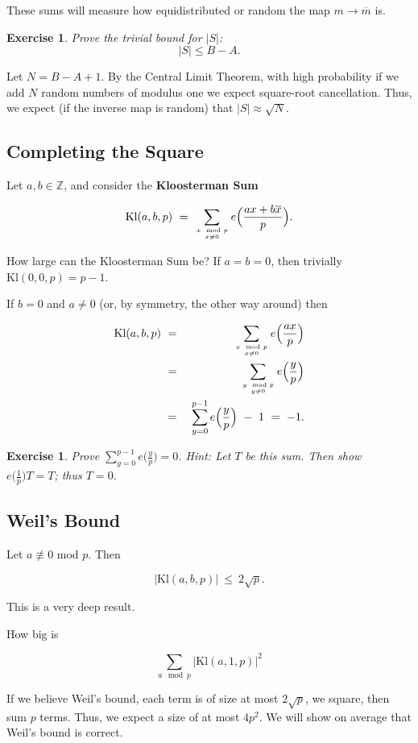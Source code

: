 \documentclass[12pt,letterpaper]{report}
\newcommand\be{\begin{equation}}
\newcommand\ee{\end{equation}}
\newcommand\bea{\begin{eqnarray}}
\newcommand\eea{\end{eqnarray}}
\newcommand{\Z}{\ensuremath{\mathbb{Z}}}
\newtheorem{exe}[thm]{Exercise}
\begin{document}
These sums will measure how equidistributed or random the map $m
\to \overline{m}$ is.

\begin{exe} Prove the trivial bound for $|S|$:
\be |S| \le B - A. \ee
\end{exe}

Let $N = B - A + 1$. By the Central Limit Theorem, with high
probability if we add $N$ random numbers of modulus one we expect
square-root cancellation. Thus, we expect (if the inverse map is
random) that $|S| \approx \sqrt{N}$.


\subsection{Completing the Square}

Let $a, b \in \Z$, and consider the \textbf{Kloosterman Sum}

\be \text{Kl}(a,b,p) \ = \ \sum_{ {x \mod p \atop x \neq 0} }
e\Big( \frac{ax + b \overline{x}}{p} \Big). \ee

How large can the Kloosterman Sum be? If $a = b = 0$, then
trivially $\text{Kl}(0,0,p) = p-1$.

If $b = 0$ and $a \neq 0$ (or, by symmetry, the other way around)
then

\bea \text{Kl}(a,b,p) & \ = \ & \sum_{ {x \mod p \atop x \neq 0} }
e\Big( \frac{ax}{p} \Big) \nonumber\\ & \ = \ & \sum_{ {y \mod p
\atop y \neq 0} } e\Big( \frac{y}{p} \Big) \nonumber\\ & \ = \ &
\sum_{y=0}^{p-1} e\Big( \frac{y}{p} \Big) \ - \ 1 \ = \ -1. \eea

\begin{exe} Prove $\sum_{y=0}^{p-1}
e\Big( \frac{y}{p} \Big) = 0$. Hint: Let $T$ be this sum. Then
show $e\Big(\frac{1}{p}\Big) T = T$; thus $T = 0$. \end{exe}


\subsection{Weil's Bound}

Let $a \not\equiv 0$ mod $p$. Then

\be |\text{Kl}(a,b,p)| \ \le \ 2\sqrt{p}. \ee

This is a very deep result.

How big is

\be \sum_{a \mod p} |\text{Kl}(a,1,p)|^2 \ee

If we believe Weil's bound, each term is of size at most
$2\sqrt{p}$, we square, then sum $p$ terms. Thus, we expect a size
of at most $4p^2$. We will show on average that Weil's bound is
correct.
\end{document}
